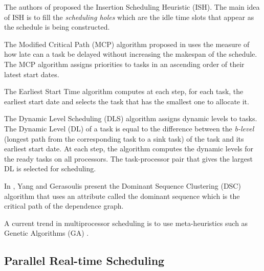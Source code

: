 The authors of \cite{kruatrachue:1987} proposed the Insertion Scheduling Heuristic (ISH). The main idea of ISH is to fill the \textit{scheduling holes} which are the idle time slots that appear as the schedule is being constructed.

The Modified Critical Path (MCP) algorithm proposed in \cite{wu:1990} uses the measure of how late can a task be delayed without increasing the makespan of the schedule. The MCP algorithm assigns priorities to tasks in an ascending order of their latest start dates. 

The Earliest Start Time algorithm \cite{hwang:1989} computes at each step, for each task, the earliest start date and selects the task that has the smallest one to allocate it. 

The Dynamic Level Scheduling (DLS) algorithm \cite{sih:1993} assigns dynamic levels to tasks. The Dynamic Level (DL) of a task is equal to the difference between the \textit{b-level} (longest path from the corresponding task to a sink task) of the task and its earliest start date. At each step, the algorithm computes the dynamic levels for the ready tasks on all processors. The task-processor pair that gives the largest DL is selected for scheduling. 

In \cite{yang:1994}, Yang and Gerasoulis present the Dominant Sequence Clustering (DSC) algorithm that uses an attribute called the dominant sequence which is the critical path of the dependence graph.

A current trend in multiprocessor scheduling is to use meta-heuristics such as Genetic Algorithms (GA) \cite{hou:1994, wu:2004, omara:2010}.

\subsection{Parallel Real-time Scheduling}

